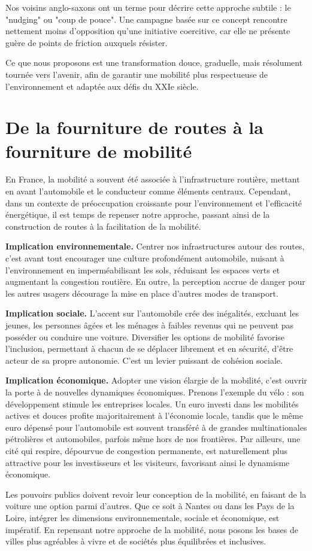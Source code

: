 Nos voisins anglo-saxons ont un terme pour décrire cette approche
subtile : le "nudging" ou "coup de pouce". Une campagne basée sur ce
concept rencontre nettement moins d'opposition qu'une initiative
coercitive, car elle ne présente guère de points de friction auxquels
résister.

Ce que nous proposons est une transformation douce, graduelle, mais
résolument tournée vers l'avenir, afin de garantir une mobilité plus
respectueuse de l'environnement et adaptée aux défis du XXIe siècle.


\section{De la fourniture de routes à la fourniture de mobilité}

En France, la mobilité a souvent été associée à l'infrastructure
routière, mettant en avant l'automobile et le conducteur comme
éléments centraux. Cependant, dans un contexte de préoccupation
croissante pour l'environnement et l'efficacité énergétique, il est
temps de repenser notre approche, passant ainsi de la construction de
routes à la facilitation de la mobilité.

\textbf{Implication environnementale.} Centrer nos infrastructures
autour des routes, c'est avant tout encourager une culture
profondément automobile, nuisant à l'environnement en imperméabilisant
les sols, réduisant les espaces verts et augmentant la congestion
routière. En outre, la perception accrue de danger pour les autres
usagers décourage la mise en place d'autres modes de transport.

\textbf{Implication sociale.} L'accent sur l'automobile crée des
inégalités, excluant les jeunes, les personnes âgées et les ménages à
faibles revenus qui ne peuvent pas posséder ou conduire une
voiture. Diversifier les options de mobilité favorise l'inclusion,
permettant à chacun de se déplacer librement et en sécurité, d'être
acteur de sa propre autonomie. C'est un levier puissant de cohésion
sociale.

\textbf{Implication économique.} Adopter une vision élargie de la
mobilité, c'est ouvrir la porte à de nouvelles dynamiques
économiques. Prenons l'exemple du vélo : son développement stimule les
entreprises locales. Un euro investi dans les mobilités actives et
douces profite majoritairement à l'économie locale, tandis que le même
euro dépensé pour l'automobile est souvent transféré à de grandes
multinationales pétrolières et automobiles, parfois même hors de nos
frontières. Par ailleurs, une cité qui respire, dépourvue de
congestion permanente, est naturellement plus attractive pour les
investisseurs et les visiteurs, favorisant ainsi le dynamisme
économique.

Les pouvoirs publics doivent revoir leur conception de la mobilité, en
faisant de la voiture une option parmi d'autres. Que ce soit à Nantes
ou dans les Pays de la Loire, intégrer les dimensions
environnementale, sociale et économique, est impératif. En repensant
notre approche de la mobilité, nous posons les bases de villes plus
agréables à vivre et de sociétés plus équilibrées et inclusives.


